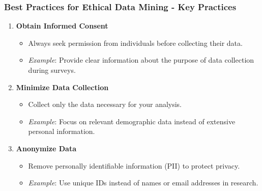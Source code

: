 \documentclass[aspectratio=169]{beamer}
\begin{document}
\begin{frame}[fragile]
    \frametitle{Best Practices for Ethical Data Mining - Key Practices}
    \begin{enumerate}
        \item \textbf{Obtain Informed Consent}
        \begin{itemize}
            \item Always seek permission from individuals before collecting their data.
            \item \textit{Example}: Provide clear information about the purpose of data collection during surveys.
        \end{itemize}

        \item \textbf{Minimize Data Collection}
        \begin{itemize}
            \item Collect only the data necessary for your analysis.
            \item \textit{Example}: Focus on relevant demographic data instead of extensive personal information.
        \end{itemize}

        \item \textbf{Anonymize Data}
        \begin{itemize}
            \item Remove personally identifiable information (PII) to protect privacy.
            \item \textit{Example}: Use unique IDs instead of names or email addresses in research.
        \end{itemize}
    \end{enumerate}
\end{frame}
\end{document}
